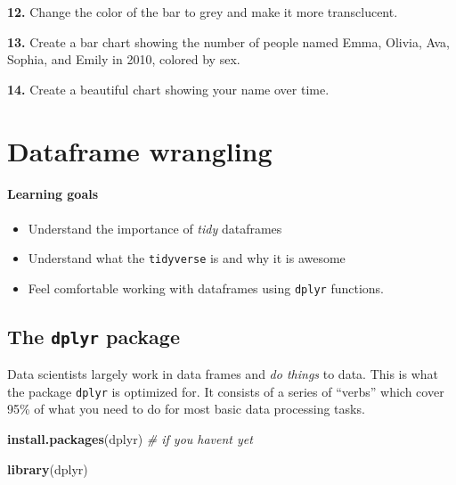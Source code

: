 \documentclass[
]{book}
\newenvironment{Shaded}{\begin{snugshade}}{\end{snugshade}}
\newcommand{\CommentTok}[1]{\textcolor[rgb]{0.56,0.35,0.01}{\textit{#1}}}
\newcommand{\FunctionTok}[1]{\textcolor[rgb]{0.13,0.29,0.53}{\textbf{#1}}}
\newcommand{\NormalTok}[1]{#1}
\newcommand{\StringTok}[1]{\textcolor[rgb]{0.31,0.60,0.02}{#1}}
\providecommand{\tightlist}{%
  \setlength{\itemsep}{0pt}\setlength{\parskip}{0pt}}
\begin{document}
\textbf{12.} Change the color of the bar to grey and make it more transclucent.

\textbf{13.} Create a bar chart showing the number of people named Emma, Olivia, Ava, Sophia, and Emily in 2010, colored by sex.

\textbf{14.} Create a beautiful chart showing your name over time.

\chapter{Dataframe wrangling}\label{dplyr}

\subsubsection*{Learning goals}\label{learning-goals-11}

\begin{itemize}
\tightlist
\item
  Understand the importance of \emph{tidy} dataframes
\item
  Understand what the \texttt{tidyverse} is and why it is awesome
\item
  Feel comfortable working with dataframes using \texttt{dplyr} functions.
\end{itemize}

\section*{\texorpdfstring{The \texttt{dplyr} package}{The dplyr package}}\label{the-dplyr-package}

Data scientists largely work in data frames and \emph{do things} to data. This is what the package \texttt{dplyr} is optimized for. It consists of a series of ``verbs'' which cover 95\% of what you need to do for most basic data processing tasks.

\begin{Shaded}
\begin{Highlighting}[]
\FunctionTok{install.packages}\NormalTok{(}\StringTok{\textquotesingle{}dplyr\textquotesingle{}}\NormalTok{) }\CommentTok{\# if you haven\textquotesingle{}t yet}
\end{Highlighting}
\end{Shaded}

\begin{Shaded}
\begin{Highlighting}[]
\FunctionTok{library}\NormalTok{(dplyr)}
\end{Highlighting}
\end{Shaded}
\end{document}
